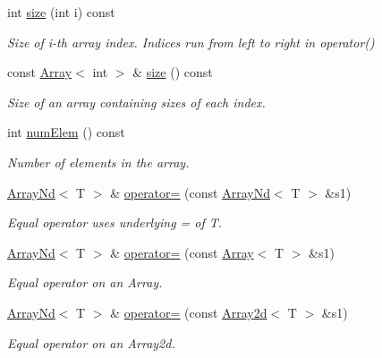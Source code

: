 \begin{DoxyCompactItemize}
int \mbox{\hyperlink{classADAT_1_1ArrayNd_aa289b2d57b41dc1c61d061865e6cb912}{size}} (int i) const
\begin{DoxyCompactList}\small\item\em Size of i-\/th array index. Indices run from left to right in operator() \end{DoxyCompactList}\item 
const \mbox{\hyperlink{classXMLArray_1_1Array}{Array}}$<$ int $>$ \& \mbox{\hyperlink{classADAT_1_1ArrayNd_a81494e519c7c5fae6e7ef2e2b46ba24b}{size}} () const
\begin{DoxyCompactList}\small\item\em Size of an array containing sizes of each index. \end{DoxyCompactList}\item 
int \mbox{\hyperlink{classADAT_1_1ArrayNd_a5c33ae0e66b53a2fd86f804f0f4292e9}{num\+Elem}} () const
\begin{DoxyCompactList}\small\item\em Number of elements in the array. \end{DoxyCompactList}\item 
\mbox{\hyperlink{classADAT_1_1ArrayNd}{Array\+Nd}}$<$ T $>$ \& \mbox{\hyperlink{classADAT_1_1ArrayNd_ae3c6bdf408c630fc44a7c6dcdac94ae1}{operator=}} (const \mbox{\hyperlink{classADAT_1_1ArrayNd}{Array\+Nd}}$<$ T $>$ \&s1)
\begin{DoxyCompactList}\small\item\em Equal operator uses underlying = of T. \end{DoxyCompactList}\item 
\mbox{\hyperlink{classADAT_1_1ArrayNd}{Array\+Nd}}$<$ T $>$ \& \mbox{\hyperlink{classADAT_1_1ArrayNd_a3290ebbe75b40ebde8f3506f2aea64a5}{operator=}} (const \mbox{\hyperlink{classXMLArray_1_1Array}{Array}}$<$ T $>$ \&s1)
\begin{DoxyCompactList}\small\item\em Equal operator on an Array. \end{DoxyCompactList}\item 
\mbox{\hyperlink{classADAT_1_1ArrayNd}{Array\+Nd}}$<$ T $>$ \& \mbox{\hyperlink{classADAT_1_1ArrayNd_a95293530c9643394ae8133f0203d342b}{operator=}} (const \mbox{\hyperlink{classXMLArray_1_1Array2d}{Array2d}}$<$ T $>$ \&s1)
\begin{DoxyCompactList}\small\item\em Equal operator on an Array2d. \end{DoxyCompactList}\item 

\end{DoxyCompactItemize}
